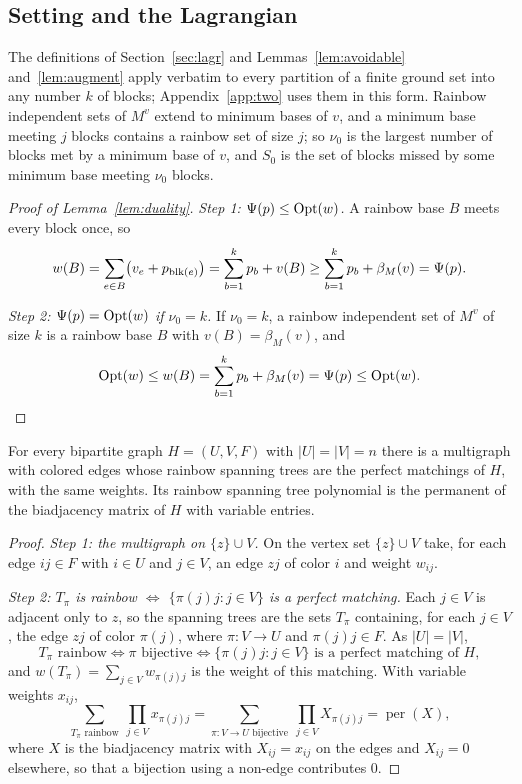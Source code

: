 \subsection{Setting and the Lagrangian}
\label{app:lagr}

The definitions of Section~\ref{sec:lagr} and Lemmas~\ref{lem:avoidable}
and~\ref{lem:augment} apply verbatim to every partition of a finite ground set
into any number $k$ of blocks; Appendix~\ref{app:two} uses them in this form.
Rainbow independent sets of $M^{v}$ extend to minimum bases of $v$, and a minimum
base meeting $j$ blocks contains a rainbow set of size $j$; so $\nu_0$ is the
largest number of blocks met by a minimum base of $v$, and $S_0$ is the set of
blocks missed by some minimum base meeting $\nu_0$ blocks.

\begin{proof}[Proof of Lemma~\ref{lem:duality}]
\emph{Step 1: $\Psi(p)\le\operatorname{Opt}(w)$.}  A rainbow base $B$ meets every block once, so
\[
  w(B)=\sum_{e\in B}\bigl(v_e+p_{\operatorname{blk}(e)}\bigr)=\sum_{b=1}^{k}p_b+v(B)
  \ge\sum_{b=1}^{k}p_b+\beta_M(v)=\Psi(p).
\]

\emph{Step 2: $\Psi(p)=\operatorname{Opt}(w)$ if $\nu_0=k$.}  If $\nu_0=k$, a rainbow independent set of
$M^{v}$ of size $k$ is a rainbow base $B$ with $v(B)=\beta_M(v)$, and
\[
  \operatorname{Opt}(w)\le w(B)=\sum_{b=1}^{k}p_b+\beta_M(v)=\Psi(p)\le\operatorname{Opt}(w).\qedhere
\]
\end{proof}

\begin{proposition}
\label{prop:star}
For every bipartite graph $H=(U,V,F)$ with $|U|=|V|=n$ there is a multigraph with
colored edges whose rainbow spanning trees are the perfect matchings of $H$, with
the same weights.  Its rainbow spanning tree polynomial is the permanent of the
biadjacency matrix of $H$ with variable entries.
\end{proposition}

\begin{proof}
\emph{Step 1: the multigraph on $\{z\}\cup V$.}  On the vertex set $\{z\}\cup V$ take, for each edge
$ij\in F$ with $i\in U$ and $j\in V$, an edge $zj$ of color $i$ and weight
$w_{ij}$.

\emph{Step 2: $T_\pi$ is rainbow $\iff$ $\{\pi(j)j:j\in V\}$ is a perfect matching.}  Each $j\in V$ is adjacent only to $z$, so the
spanning trees are the sets $T_\pi$ containing, for each $j\in V$, the edge $zj$ of
color $\pi(j)$, where $\pi:V\to U$ and $\pi(j)j\in F$.  As $|U|=|V|$,
\[
  T_\pi\text{ rainbow}\iff\pi\text{ bijective}
  \iff\{\pi(j)j:j\in V\}\text{ is a perfect matching of }H,
\]
and $w(T_\pi)=\sum_{j\in V}w_{\pi(j)j}$ is the weight of this matching.  With
variable weights $x_{ij}$,
\[
  \sum_{T_\pi\text{ rainbow}}\ \prod_{j\in V}x_{\pi(j)j}
  =\sum_{\pi:V\to U\text{ bijective}}\ \prod_{j\in V}X_{\pi(j)j}=\operatorname{per}(X),
\]
where $X$ is the biadjacency matrix with $X_{ij}=x_{ij}$ on the edges and
$X_{ij}=0$ elsewhere, so that a bijection using a non-edge contributes $0$.
\end{proof}

